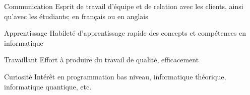 

\begin{cvskills}

  \cvskill
    {Communication} %
    {Esprit de travail d'équipe et de relation avec les clients, ainsi qu'avec les étudiants; en français ou en anglais}
    
  \cvskill
    {Apprentissage} %
    {Habileté d'apprentissage rapide des concepts et compétences en informatique}
    
  \cvskill
    {Travaillant} %
    {Effort à produire du travail de qualité, efficacement}
    
  \cvskill
    {Curiosité} %
    {Intérêt en programmation bas niveau, informatique théorique, informatique quantique, etc.}

\end{cvskills}
